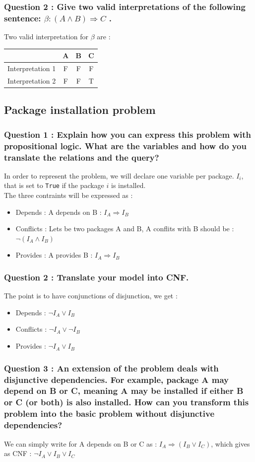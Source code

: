 \documentclass[a4paper,10pt]{article}
\begin{document}
\subsubsection*{Question 2 : Give two valid interpretations of the following sentence: $\beta : (A \wedge B) \Rightarrow C$ .}
Two valid interpretation for $\beta$ are :
\begin{center}
\begin{tabular}{|c|c|c|c|}
  \hline
   & \textbf{A} & \textbf{B} & \textbf{C} \\
  \hline
  Interpretation 1 & F & F & F \\
  \hline
  Interpretation 2 & F & F & T \\
  \hline
\end{tabular}
\end{center}
\subsection{Package installation problem}
\subsubsection{Question 1 : Explain how you can express this problem with propositional logic. What are the variables and how do you translate the relations and the query?}
In order to represent the problem, we will declare one variable per package. $I_{i}$, that is set to \texttt{True} if the package $i$ is installed.\\
The three contraints will be expressed as :
\begin{itemize}
  \item Depends : A depends on B : $I_{A} \Rightarrow I_{B}$
  \item Conflicts : Lets be two packages A and B, A conflits with B should be : $\neg (I_{A} \wedge I_{B})$ 
  \item Provides : A provides B : $I_{A} \Rightarrow I_{B}$
\end{itemize}

\subsubsection{Question 2 : Translate your model into CNF.}
The point is to have conjunctions of disjunction, we get :
\begin{itemize}
  \item Depends : $\neg I_{A} \vee I_{B}$
  \item Conflicts : $\neg I_{A} \vee \neg I_{B}$
  \item Provides : $\neg I_{A} \vee I_{B}$
\end{itemize}

\subsubsection{Question 3 : An extension of the problem deals with disjunctive dependencies. For example, package A may depend on B or C, meaning A may be installed if either B or C (or both) is also installed. How can you transform this problem into the basic problem without disjunctive dependencies?}
We can simply write for A depends on B or C as : $I_{A} \Rightarrow (I_{B} \vee I_{C})$, which gives as CNF : $\neg I_{A} \vee I_{B} \vee I_{C}$
\end{document}

